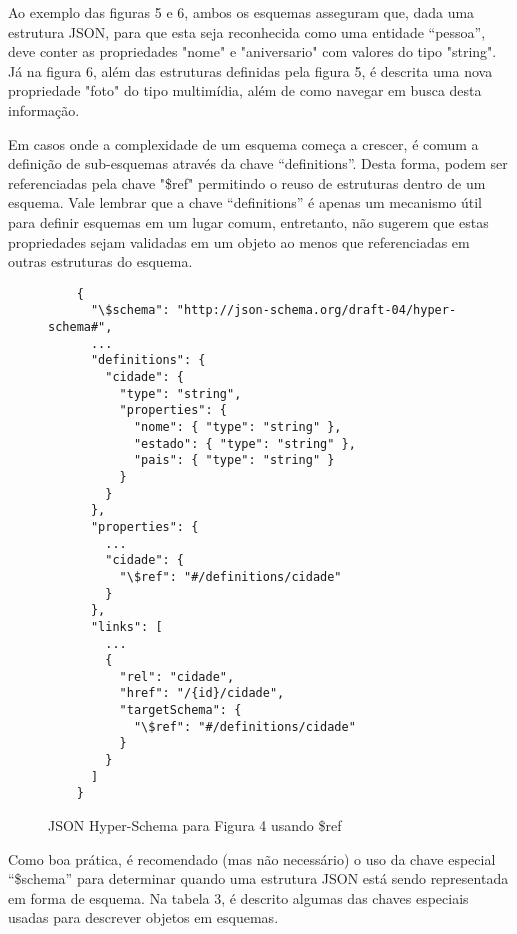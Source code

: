 Ao exemplo das figuras 5 e 6, ambos os esquemas asseguram que, dada uma estrutura JSON, para que esta seja reconhecida como uma entidade “pessoa”, deve conter as propriedades "nome" e "aniversario" com valores do tipo "string". Já na figura 6, além das estruturas definidas pela figura 5, é descrita uma nova propriedade "foto" do tipo multimídia, além de como navegar em busca desta informação.

Em casos onde a complexidade de um esquema começa a crescer, é comum a definição de sub-esquemas através da chave “definitions”. Desta forma, podem ser referenciadas pela chave "\$ref" permitindo o reuso de estruturas dentro de um esquema. Vale lembrar que a chave “definitions” é apenas um mecanismo útil para definir esquemas em um lugar comum, entretanto, não sugerem que estas propriedades sejam validadas em um objeto ao menos que referenciadas em outras estruturas do esquema. \cite{Leach2014}

\begin{figure}[H]
  \centering
  \begin{verbatim}
    {
      "\$schema": "http://json-schema.org/draft-04/hyper-schema#",
      ...
      "definitions": {
        "cidade": {
          "type": "string",
          "properties": {
            "nome": { "type": "string" },
            "estado": { "type": "string" },
            "pais": { "type": "string" }
          }
        }
      },
      "properties": {
        ...
        "cidade": {
          "\$ref": "#/definitions/cidade"
        }
      },
      "links": [
        ...
        {
          "rel": "cidade",
          "href": "/{id}/cidade",
          "targetSchema": {
            "\$ref": "#/definitions/cidade"
          }
        }
      ]
    }
  \end{verbatim}
  \caption{JSON Hyper-Schema para Figura 4 usando \$ref}
\end{figure}

Como boa prática, é recomendado (mas não necessário) o uso da chave especial “\$schema” para determinar quando uma estrutura JSON está sendo representada em forma de esquema. Na tabela 3, é descrito algumas das chaves especiais usadas para descrever objetos em esquemas. \cite{Droettboom2015}

